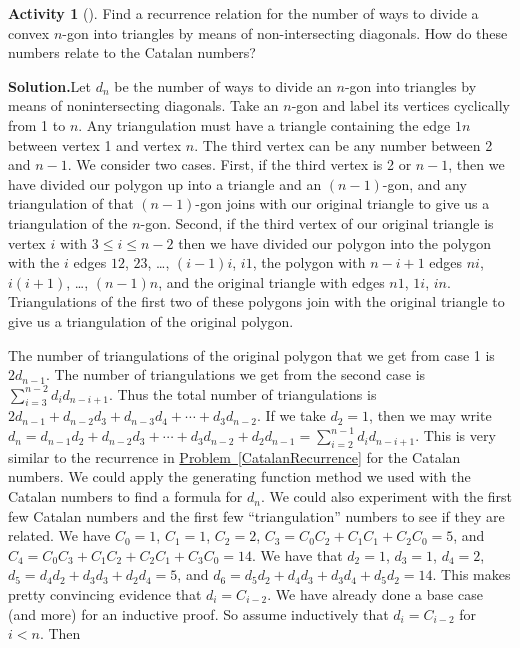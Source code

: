 \documentclass[10pt,]{book}
\theoremstyle{plain}
\theoremstyle{definition}
\newtheorem{activity}[project]{Activity}
\numberwithin{equation}{chapter}
\newcommand{\lt}{<}
\begin{document}
\begin{activity}[]\label{activity-200}
Find a recurrence relation for the number of ways to divide a convex \(n\)-gon into triangles by means of non-intersecting diagonals.  How do these numbers relate to the Catalan numbers?%
\par\medskip\noindent%
\textbf{Solution.}\quad Let \(d_n\) be the number of ways to divide an \(n\)-gon into triangles by means of nonintersecting diagonals. Take an \(n\)-gon and label its vertices cyclically from 1 to \(n\). Any triangulation must have a triangle containing the edge \(1n\) between vertex 1 and vertex \(n\). The third vertex can be any number between 2 and \(n-1\). We consider two cases. First, if the third vertex is 2 or \(n-1\), then we have divided our polygon up into a triangle and an \((n-1)\)-gon, and any triangulation of that \((n-1)\)-gon joins with our original triangle to give us a triangulation of the \(n\)-gon. Second, if the third vertex of our original triangle is vertex \(i\) with \(3\le i\le n-2\) then we have divided our polygon into the polygon with the \(i\) edges \(12\), \(23\), \dots{}, \((i-1)i\), \(i1\), the polygon with \(n-i+1\) edges \(ni\), \(i(i+1)\), \dots{}, \((n-1)n\), and the original triangle with edges \(n1\), \(1i\), \(in\). Triangulations of the first two of these polygons join with the original triangle to give us a triangulation of the original polygon.%
\par
The number of triangulations of the original polygon that we get from case 1 is \(2d_{n-1}\). The number of triangulations we get from the second case is \(\sum_{i=3}^{n-2} d_id_{n-i+1}\). Thus the total number of triangulations is \(2d_{n-1}+d_{n-2}d_3 + d_{n-3}d_4 +\cdots + d_3d_{n-2}\). If we take \(d_2=1\), then we may write \(d_n = d_{n-1}d_2+d_{n-2}d_3 +\cdots+d_3d_{n-2} + d_2d_{n-1}=\sum\limits_{i=2}^{n-1} d_id_{n-i+1}\). This is very similar to the recurrence in \hyperref[CatalanRecurrence]{Problem~\ref{CatalanRecurrence}} for the Catalan numbers. We could apply the generating function method we used with the Catalan numbers to find a formula for \(d_n\). We could also experiment with the first few Catalan numbers and the first few ``triangulation'' numbers to see if they are related. We have \(C_0=1\), \(C_1=1\), \(C_2=2\), \(C_3=C_0C_2+C_1C_1 +C_2C_0=5\), and \(C_4=C_0C_3+C_1C_2+C_2C_1+C_3C_0=14\). We have that \(d_2=1\), \(d_3=1\), \(d_4=2\), \(d_5=d_4d_2+d_3d_3+d_2d_4=5\), and \(d_6=d_5d_2+d_4d_3+d_3d_4+d_5d_2=14\). This makes pretty convincing evidence that \(d_i= C_{i-2}\). We have already done a base case (and more) for an inductive proof. So assume inductively that \(d_{i}=C_{i-2}\) for \(i\lt n\). Then%

\end{activity}
\end{document}
